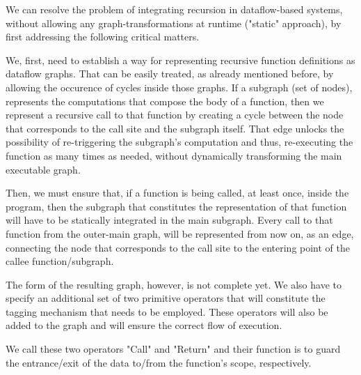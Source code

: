 \documentclass[ack,preface]{dithesis}
\begin{document}
We can resolve the problem of integrating recursion in dataflow-based systems, without allowing any graph-transformations at runtime ("static" approach), by first addressing the following critical matters.

We, first, need to establish a way for representing recursive function definitions as dataflow graphs.  That can be easily treated, as already mentioned before, by allowing the occurence of cycles inside those graphs. If a subgraph (set of nodes), represents the computations that compose the body of a function, then we represent a recursive call to that function by creating a cycle between the node that corresponds to the call site and the subgraph itself. That edge unlocks the possibility of  re-triggering the subgraph's computation and thus, re-executing the function as many times as needed, without dynamically transforming the main executable graph.

Then, we must ensure that, if a function is being called, at least once, inside the program, then the subgraph that constitutes the representation of that function will have to be statically integrated in the main subgraph. Every call to that function from the outer-main graph, will be represented from now on, as an edge, connecting the node that corresponds to the call site to the entering point of the callee function/subgraph.

The form of the resulting graph, however, is not complete yet. We also have to specify an additional set of two primitive operators that will constitute the tagging mechanism that needs to be employed. These operators will also be added to the graph and will ensure the correct flow of execution.

We call these two operators "Call" and "Return" and their function is to guard the entrance/exit of the data to/from the function's scope, respectively.
\end{document}
